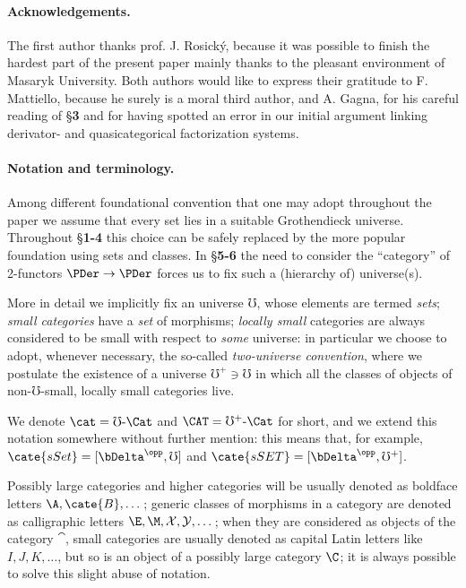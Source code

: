 \paragraph{\bf Acknowledgements.} The first author thanks prof\@. J\@. Rosick\'y, because it was possible to finish the hardest part of the present paper mainly thanks to the pleasant environment of Masaryk University.
Both authors would like to express their gratitude to F\@. Mattiello, because he surely is a moral third author, and A\@. Gagna, for his careful reading of §\textbf{3} and for having spotted an error in our initial argument linking derivator- and quasicategorical factorization systems.

\medskip
\paragraph*{\bf Notation and terminology.}
Among different foundational convention that one may adopt throughout the paper we assume that every set lies in a suitable Grothendieck universe. Throughout §\textbf{1-4} this choice can be safely replaced by the more popular foundation using sets and classes. In §\textbf{5-6} the need to consider the ``category'' of 2-functors $\PDer \to \PDer$ forces us to fix such a (hierarchy of) universe(s).

More in detail we implicitly fix an universe $\mho$, whose elements are termed \emph{sets}; \emph{small categories} have a \emph{set} of morphisms; \emph{locally small} categories are always considered to be small with respect to \emph{some} universe: in particular we choose to adopt, whenever necessary, the so\hyp{}called \emph{two\hyp{}universe convention}, where we postulate the existence of a universe $\mho^+\ni \mho$ in which all the classes of objects of non\hyp{}$\mho$\hyp{}small, locally small categories live.

We denote $\cat = \mho\text{-}\Cat$ and $\CAT = \mho^+\text{-}\Cat$ for short, and we extend this notation somewhere without further mention: this means that, for example, $\cate{sSet} = [\bDelta^\opp,\mho]$ and $\cate{sSET} = [\bDelta^\opp, \mho^+]$.

Possibly large categories and higher categories will be usually denoted as boldface letters $\A,\cate{B},\dots$; generic classes of morphisms in a category are denoted as calligraphic letters $\E, \M, \mathcal{X},\mathcal{Y},\dots$; when they are considered as objects of the category $\cat$, small categories are usually denoted as capital Latin letters like $I,J,K,\dots$, but so is an object of a possibly large category $\C$; it is always possible to solve this slight abuse of notation.

